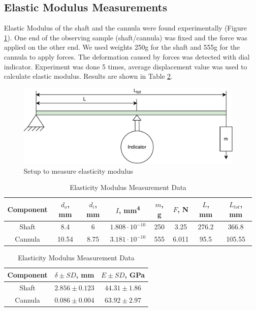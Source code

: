 	\subsection{Elastic Modulus Measurements}
	\label{sec:ElasMod}
	Elastic Modulus of the shaft and the cannula were found experimentally (Figure \ref{fig:ElasModSet}). One end of the observing sample (shaft/cannula) was fixed and the force was applied on the other end. We used weights 250g for the shaft and 555g for the cannula to apply forces. The deformation caused by forces was detected with dial indicator. Experiment was done 5 times, average displacement value was used to calculate elastic modulus. Results are shown in Table \ref{tab:elasMod}.
	
\begin{figure}[h]
	\begin{center}
		\includegraphics[width=120mm]{fig/methods/el_mod_set.pdf}
	\end{center}
	\vspace{-4mm}
	\caption[Setup to measure elasticity modulus]
	{Setup to measure elasticity modulus}
	\label{fig:ElasModSet}
	\vspace{-2mm}
\end{figure}

\begin{table}
\caption {Elasticity Modulus Measurement Data} \label{tab:elasMod} 
\begin{tabular}{ | c | c | c | c | c | c | c | c | } 
\hline
Component & $d_o$, mm & $d_i$, mm & $I$, mm\textsuperscript{4} & $m$, g & $F$, N & $L$, mm & $L_{tot}$, mm \\ 
\hline
Shaft & 8.4 & 6 & $1.808 \cdot 10^{-10}$ & 250 & 3.25 & 276.2 & 366.8\\ 
\hline
Cannula & 10.54 & 8.75 & $3.181 \cdot 10^{-10}$ & 555 & 6.011 & 95.5 & 105.55 \\ 
\hline
\end{tabular}

\begin{tabular}{ | c | c | c | } 
\hline
Component & $\delta \pm SD$, mm & $E \pm SD$, GPa \\ 
\hline
Shaft & $2.856 \pm 0.123$ & $44.31 \pm 1.86$ \\ 
\hline
Cannula & $0.086 \pm 0.004$ & $63.92 \pm 2.97$ \\ 
\hline
\end{tabular}
\end{table}

